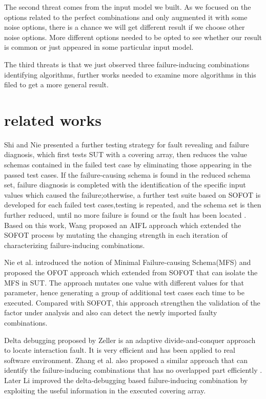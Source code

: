 \documentclass{sig-alternate}
\begin{document}
The second threat comes from the input model we built. As we focused on the options related to the perfect combinations and only augmented it with some noise options, there is a chance we will get different result if we choose other noise options. More different options needed to be opted to see whether our result is common or just appeared in some particular input model.

The third threats is that we just observed three failure-inducing combinations identifying algorithms, further works needed to examine more algorithms in this filed to get a more general result.

\section{related works}

Shi and Nie presented a further testing strategy for fault revealing and failure diagnosis\cite{shi2005software}, which first tests SUT with a covering array, then reduces the value schemas contained in the failed test case by eliminating those appearing in the passed test cases. If the failure-causing schema is found in the reduced schema set, failure diagnosis is completed with the identification of the specific input values which caused the failure;otherwise, a further test suite based on SOFOT is developed for each failed test cases,testing is repeated, and the schema set is then further reduced, until no more failure is found or the fault has been located . Based on this work, Wang proposed an AIFL approach which extended the SOFOT process by mutating the changing strength in each iteration of characterizing failure-inducing combinations\cite{wang2010adaptive}.

Nie et al. introduced the notion of Minimal Failure-causing Schema(MFS) and proposed the OFOT approach which extended from SOFOT that can isolate the MFS in SUT\cite{nie2011minimal}. The approach mutates one value with different values for that parameter, hence generating a group of additional test cases each time to be executed. Compared with SOFOT, this approach  strengthen the validation of the factor under analysis and also can detect the newly imported faulty combinations.

Delta debugging \cite{zeller2002simplifying} proposed by Zeller is an adaptive divide-and-conquer approach to locate interaction fault. It is very efficient and has been applied to real software environment. Zhang et al. also proposed a similar approach that can identify the failure-inducing combinations that has no overlapped part efficiently \cite{zhang2011characterizing}. Later Li improved the delta-debugging based failure-inducing combination by exploiting the useful information in the executed covering array\cite{li2012improved}.
\end{document}
